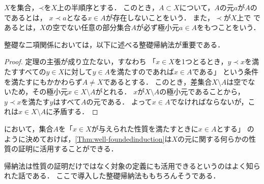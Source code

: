 
\begin{Def} \label{Def:well-foundedset}
	\(X\)を集合，\(\mathord{\prec}\)を\(X\)上の半順序とする．
	このとき，\(A \subset X\)について，\(A\)の元\(a\)が\(A\)の%
	であるとは，
	\(x \prec a\)となる\(x \in A\)が存在しないことをいう．
	また，\(\prec\)が\(X\)上で%
	であるとは，\(X\)の空でない任意の部分集合\(A\)が必ず極小元\(a \in A\)をもつことをいう．
\end{Def}

整礎な二項関係においては，以下に述べる整礎帰納法が重要である．


\begin{proof}
	定理の主張が成り立たない，すなわち
	「\(x \in X\)を1つとるとき，\(y \prec x\)を満たすすべての\(y \in X\)に対して\(y \in A\)を満たすのであれば\(x \in A\)である」
	という条件を満たすにもかかわらず\(A \neq X\)であるとする．
	このとき，差集合\(X \setminus A\)は空でないため，その極小元\(x \in X \setminus A\)がとれる．
	\(x\)が\(X \setminus A\)の極小元であることから，\(y \prec x\)を満たす\(y\)はすべて\(A\)の元である．
	よって\(x \in A\)でなければならないが，これは\(x \in X \setminus A\)に矛盾する．
\end{proof}

において，集合\(A\)を「\(x \in X\)が与えられた性質を満たすときに\(x \in A\)とする」
のように決めておけば，\cref{Thm:well-foundedinduction}は\(X\)の元に関する何らかの性質の証明に活用することができる．

帰納法は性質の証明だけではなく対象の定義にも活用できるというのはよく知られた話である．
ここで導入した整礎帰納法ももちろんそうである．


